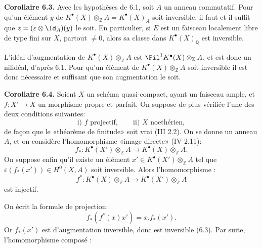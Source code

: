 \textbf{Corollaire 6.3.} Avec les hypothèses de 6.1, soit $A$ un anneau commutatif. Pour qu'un élément $y$ de $K^{\bullet}(X)\otimes_{\mathbb Z}A=K^{\bullet}(X)_A$ soit inversible, il faut et il suffit que $z=(\varepsilon\otimes\Id_A)(y)$ le soit. En particulier, si $E$ est un faisceau localement libre de type fini sur $X$, partout $\ne0$, alors sa classe dans $K^{\bullet}(X)_{\mathbb Q}$ est inversible.

L'idéal d'augmentation de $K^{\bullet}(X)\otimes_{\mathbb Z}A$ est $\Fil^1K^{\bullet}(X)\otimes_{\mathbb Z}A$, et est donc un nilidéal, d'après 6.1. Pour qu'un élément de $K^{\bullet}(X)\otimes_{\mathbb Z}A$ soit inversible il est donc nécessaire et suffisant que son augmentation le soit.

\textbf{Corollaire 6.4.} Soient $X$ un schéma quasi-compact, ayant un faisceau ample, et $f:X'\to X$ un morphisme propre et parfait. On suppose de plus vérifiée l'une des deux conditions suivantes:
\[
  \text{i) } f\text{ projectif},\qquad
  \text{ii) } X\text{ noethérien},
\]
de façon que le «théorème de finitude» soit vrai (III 2.2). On se donne un anneau $A$, et on considère l'homomorphisme «image directe» (IV 2.11):
\[
  f_*:K^{\bullet}(X')\otimes_{\mathbb Z}A\longrightarrow K^{\bullet}(X)\otimes_{\mathbb Z}A.
\]
On suppose enfin qu'il existe un élément $x'\in K^{\bullet}(X')\otimes_{\mathbb Z}A$ tel que $\varepsilon(f_*(x'))\in H^0(X,A)$ soit inversible. Alors l'homomorphisme :
\[
  f^*:K^{\bullet}(X)\otimes_{\mathbb Z}A\longrightarrow K^{\bullet}(X')\otimes_{\mathbb Z}A
\]
est injectif.

On écrit la formule de projection:
\[
  f_*(f^*(x)x')=x.f_*(x').
\]
Or $f_*(x')$ est d'augmentation inversible, donc est inversible (6.3). Par suite, l'homomorphisme composé :
